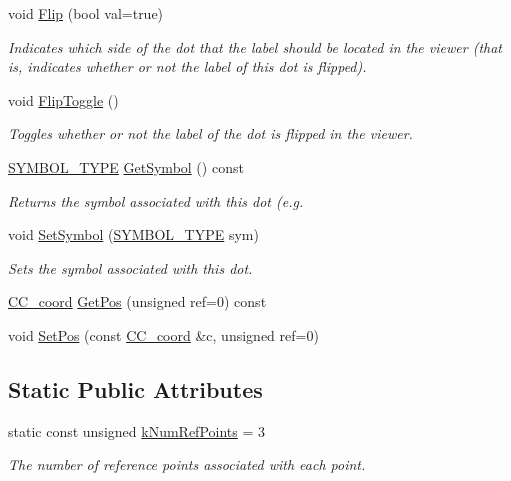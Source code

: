 \begin{DoxyCompactItemize}
void \hyperlink{a00034_ab13b2611cdb23e13c1cb8231d0ab73ff}{Flip} (bool val=true)
\begin{DoxyCompactList}\small\item\em Indicates which side of the dot that the label should be located in the viewer (that is, indicates whether or not the label of this dot is flipped). \end{DoxyCompactList}\item 
void \hyperlink{a00034_ae593f6c7994bcec3b30b5b1f9744d098}{Flip\-Toggle} ()
\begin{DoxyCompactList}\small\item\em Toggles whether or not the label of the dot is flipped in the viewer. \end{DoxyCompactList}\item 
\hyperlink{a00216_a68cd84e0300be6f9ff4474682762c9ee}{S\-Y\-M\-B\-O\-L\-\_\-\-T\-Y\-P\-E} \hyperlink{a00034_ab87115812c129465788ae5da5d684110}{Get\-Symbol} () const 
\begin{DoxyCompactList}\small\item\em Returns the symbol associated with this dot (e.\-g. \end{DoxyCompactList}\item 
void \hyperlink{a00034_ad797e691ddb9b681a8b204de3ee87e33}{Set\-Symbol} (\hyperlink{a00216_a68cd84e0300be6f9ff4474682762c9ee}{S\-Y\-M\-B\-O\-L\-\_\-\-T\-Y\-P\-E} sym)
\begin{DoxyCompactList}\small\item\em Sets the symbol associated with this dot. \end{DoxyCompactList}\item 
\hyperlink{a00029}{C\-C\-\_\-coord} \hyperlink{a00034_aa969cddcae9eb35d23b38829775927c7}{Get\-Pos} (unsigned ref=0) const 
\item 
void \hyperlink{a00034_aea2566cb1dd1c1bbde6ce83150462037}{Set\-Pos} (const \hyperlink{a00029}{C\-C\-\_\-coord} \&c, unsigned ref=0)
\end{DoxyCompactItemize}
\subsection*{Static Public Attributes}
\begin{DoxyCompactItemize}
\item 
static const unsigned \hyperlink{a00034_a2b34de427e5864328fd455f3122d96f4}{k\-Num\-Ref\-Points} = 3
\begin{DoxyCompactList}\small\item\em The number of reference points associated with each point. \end{DoxyCompactList}\end{DoxyCompactItemize}
